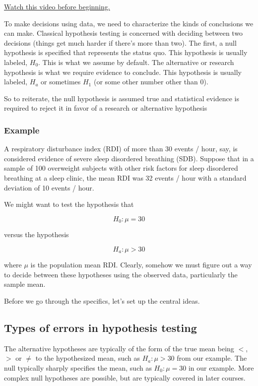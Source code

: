 \documentclass[]{article}
\begin{document}
\href{http://youtu.be/Wqvx6_12ZMs?list=PLpl-gQkQivXiBmGyzLrUjzsblmQsLtkzJ}{Watch
this video before beginning.}

To make decisions using data, we need to characterize the kinds of
conclusions we can make. Classical hypothesis testing is concerned with
deciding between two decisions (things get much harder if there's more
than two). The first, a null hypothesis is specified that represents the
status quo. This hypothesis is usually labeled, $H_0$. This is what we
assume by default. The alternative or research hypothesis is what we
require evidence to conclude. This hypothesis is usually labeled, $H_a$
or sometimes $H_1$ (or some other number other than 0).

So to reiterate, the null hypothesis is assumed true and statistical
evidence is required to reject it in favor of a research or alternative
hypothesis

\subsubsection{Example}\label{example-17}

A respiratory disturbance index (RDI) of more than 30 events / hour,
say, is considered evidence of severe sleep disordered breathing (SDB).
Suppose that in a sample of 100 overweight subjects with other risk
factors for sleep disordered breathing at a sleep clinic, the mean RDI
was 32 events / hour with a standard deviation of 10 events / hour.

We might want to test the hypothesis that

\[H_0 : \mu = 30\]

versus the hypothesis

\[H_a : \mu > 30\]

where $\mu$ is the population mean RDI. Clearly, somehow we must figure
out a way to decide between these hypotheses using the observed data,
particularly the sample mean.

Before we go through the specifics, let's set up the central ideas.

\subsection{Types of errors in hypothesis
testing}\label{types-of-errors-in-hypothesis-testing}

The alternative hypotheses are typically of the form of the true mean
being $<$, $>$ or $\neq$ to the hypothesized mean, such as
$H_a : \mu > 30$ from our example. The null typically sharply specifies
the mean, such as $H_0 : \mu = 30$ in our example. More complex null
hypotheses are possible, but are typically covered in later courses.
\end{document}
